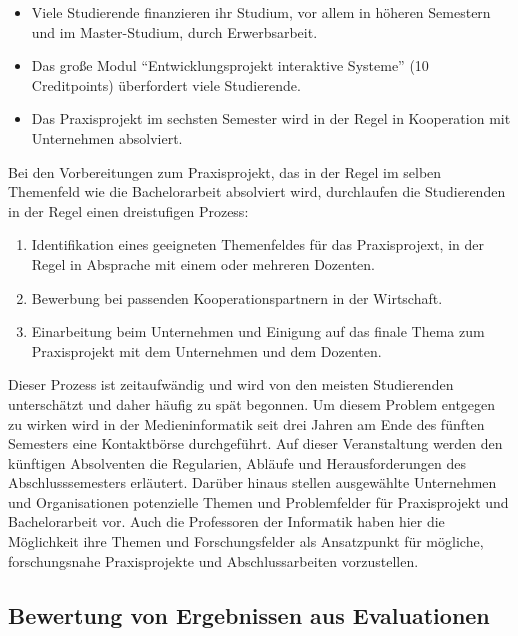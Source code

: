 \begin{itemize}
\tightlist
\item
  Viele Studierende finanzieren ihr Studium, vor allem in höheren
  Semestern und im Master-Studium, durch Erwerbsarbeit.
\item
  Das große Modul ``Entwicklungsprojekt interaktive Systeme'' (10
  Creditpoints) überfordert viele Studierende.
\item
  Das Praxisprojekt im sechsten Semester wird in der Regel in
  Kooperation mit Unternehmen absolviert.
\end{itemize}

Bei den Vorbereitungen zum Praxisprojekt, das in der Regel im selben
Themenfeld wie die Bachelorarbeit absolviert wird, durchlaufen die
Studierenden in der Regel einen dreistufigen Prozess:

\begin{enumerate}
\def\labelenumi{\arabic{enumi}.}
\tightlist
\item
  Identifikation eines geeigneten Themenfeldes für das Praxisprojext, in
  der Regel in Absprache mit einem oder mehreren Dozenten.
\item
  Bewerbung bei passenden Kooperationspartnern in der Wirtschaft.
\item
  Einarbeitung beim Unternehmen und Einigung auf das finale Thema zum
  Praxisprojekt mit dem Unternehmen und dem Dozenten.
\end{enumerate}

Dieser Prozess ist zeitaufwändig und wird von den meisten Studierenden
unterschätzt und daher häufig zu spät begonnen. Um diesem Problem
entgegen zu wirken wird in der Medieninformatik seit drei Jahren am Ende
des fünften Semesters eine Kontaktbörse durchgeführt. Auf dieser
Veranstaltung werden den künftigen Absolventen die Regularien, Abläufe
und Herausforderungen des Abschlusssemesters erläutert. Darüber hinaus
stellen ausgewählte Unternehmen und Organisationen potenzielle Themen
und Problemfelder für Praxisprojekt und Bachelorarbeit vor. Auch die
Professoren der Informatik haben hier die Möglichkeit ihre Themen und
Forschungsfelder als Ansatzpunkt für mögliche, forschungsnahe
Praxisprojekte und Abschlussarbeiten vorzustellen.

\subsection{Bewertung von Ergebnissen aus
Evaluationen\label{/mi-2017/selbstbericht/0100-ist-zustand/0100-ist-zustand}}\label{bewertung-von-ergebnissen-aus-evaluationenpathlabelmi-2017selbstbericht0100-ist-zustand0100-ist-zustand}

